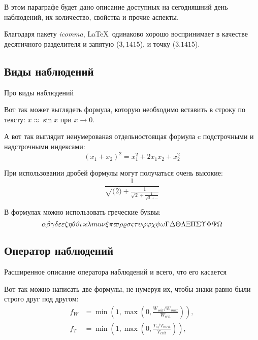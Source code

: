 В этом параграфе будет дано описание доступных на сегодняшний день наблюдений, их количество, свойства и прочие аспекты.

Благодаря пакету \textit{icomma}, \LaTeX~одинаково хорошо воспринимает в качестве десятичного разделителя и запятую ($3,1415$), и точку ($3.1415$).

\subsection{Виды наблюдений} \label{subsect1_4_1}

Про виды наблюдений

Вот так может выглядеть формула, которую необходимо вставить в строку по тексту: $x \approx \sin x$ при $x \to 0$.

А вот так выглядит ненумерованая отдельностоящая формула c подстрочными и надстрочными индексами:
\[
(x_1+x_2)^2 = x_1^2 + 2 x_1 x_2 + x_2^2
\]

При использовании дробей формулы могут получаться очень высокие:
\[
  \frac{1}{\sqrt(2)+
  \displaystyle\frac{1}{\sqrt{2}+
  \displaystyle\frac{1}{\sqrt{2}+\cdots}}}
\]

В формулах можно использовать греческие буквы:
\[
\alpha\beta\gamma\delta\epsilon\varepsilon\zeta\eta\theta\vartheta\iota\kappa\lambda\\mu\nu\xi\pi\varpi\rho\varrho\sigma\varsigma\tau\upsilon\phi\varphi\chi\psi\omega\Gamma\Delta\Theta\Lambda\Xi\Pi\Sigma\Upsilon\Phi\Psi\Omega
\]


\subsection{Оператор наблюдений} \label{subsect1_4_2}

Расширенное описание оператора наблюдений и всего, что его касается

Вот так можно написать две формулы, не нумеруя их, чтобы знаки равно были строго друг под другом:
\begin{align}
  f_W & =  \min \left( 1, \max \left( 0, \frac{W_{soil} / W_{max}}{W_{crit}} \right)  \right), \nonumber \\
  f_T & =  \min \left( 1, \max \left( 0, \frac{T_s / T_{melt}}{T_{crit}} \right)  \right), \nonumber
\end{align}

